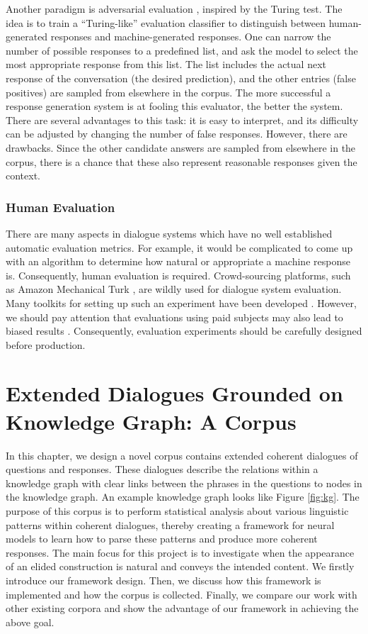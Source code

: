 \documentclass[bsc,frontabs,twoside,singlespacing,parskip,deptreport]{infthesis}     %
\begin{document}
Another paradigm is adversarial evaluation \cite{bowman2015generating,kannan2017adversarial,li2017adversarial}, inspired by the Turing test. The idea is to train a “Turing-like” evaluation classifier to distinguish between human-generated responses and machine-generated responses. One can narrow the number of possible responses to a predefined list, and ask the model to select the most appropriate response from this list. The list includes the actual next response of the conversation (the desired prediction), and the other entries (false positives) are sampled from elsewhere in the corpus. The more successful a response generation system is at fooling this evaluator, the better the system. There are several advantages to this task: it is easy to interpret, and its difficulty can be adjusted by changing the number of false responses. However, there are drawbacks. Since the other candidate answers are sampled from elsewhere in the corpus, there is a chance that these also represent reasonable responses given the context. 

\subsection{Human Evaluation}

There are many aspects in dialogue systems which have no well established automatic evaluation metrics. For example, it would be complicated to come up with an algorithm to determine how natural or appropriate a machine response is. Consequently, human evaluation is required. Crowd-sourcing platforms, such as Amazon Mechanical Turk \cite{mturk}, are wildly used for dialogue system evaluation. Many toolkits for setting up such an experiment have been developed \cite{lee2018dialcrowd}. However, we should pay attention that evaluations using paid subjects may also lead to biased results \cite{young2013pomdp}. Consequently, evaluation experiments should be carefully designed before production.



\chapter{Extended Dialogues Grounded on Knowledge Graph: A Corpus}

In this chapter, we design a novel corpus contains extended coherent dialogues of questions and responses. These dialogues describe the relations within a knowledge graph with clear links between the phrases in the questions to nodes in the knowledge graph. An example knowledge graph looks like Figure \ref{fig:kg}. The purpose of this corpus is to perform statistical analysis about various linguistic patterns within coherent dialogues, thereby creating a framework for neural models to learn how to parse these patterns and produce more coherent responses. The main focus for this project is to investigate when the appearance of an elided construction is natural and conveys the intended content. We firstly introduce our framework design. Then, we discuss how this framework is implemented and how the corpus is collected. Finally, we compare our work with other existing corpora and show the advantage of our framework in achieving the above goal.
\end{document}
